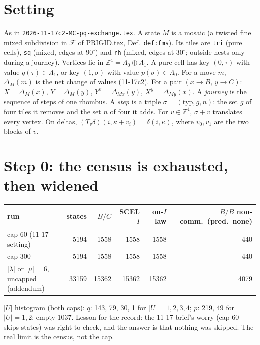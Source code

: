 \documentclass[11pt]{article}
\theoremstyle{definition}\newtheorem{definition}[theorem]{Definition}\newtheorem{remark}[theorem]{Remark}
\begin{document}
\section{Setting}
As in \texttt{2026-11-17c2-MC-pq-exchange.tex}. A state $M$ is a mosaic (a twisted fine mixed subdivision in $\mathcal F$ of PRIGID.tex, Def.~\texttt{def:fms}). Its tiles are
\texttt{tri} (pure cells), \texttt{sq} (mixed, edges at $90^\circ$) and \texttt{rh} (mixed, edges at $30^\circ$; outside nests only during a journey). Vertices lie in
$\mathbb Z^4=\Lambda_0\oplus\Lambda_1$. A pure cell has key $(0,\tau)$ with value $q(\tau)\in\Lambda_1$, or key $(1,\sigma)$ with value $p(\sigma)\in\Lambda_0$. For a move $m$,
$\Delta_M(m)$ is the net change of values (11-17c2). For a pair $(x\to B,\,y\to C)$: $X=\Delta_M(x)$, $Y=\Delta_M(y)$, $Y^x=\Delta_{Mx}(y)$, $X^y=\Delta_{My}(x)$.
A \emph{journey} is the sequence of steps of one rhombus. A \emph{step} is a triple $\sigma=(\mathrm{typ},g,n)$: the set $g$ of four tiles it removes and the set $n$ of four it adds.
For $v\in\mathbb Z^4$, $\sigma+v$ translates every vertex. On deltas, $(T_v\delta)(i,\kappa+v_i)=\delta(i,\kappa)$, where $v_0,v_1$ are the two blocks of $v$.

\section{Step 0: the census is exhausted, then widened}\label{sec:step0}
\begin{center}\begin{tabular}{lrrrrr}\toprule
run & states & $B/C$ & SCEL $I$ & on-$I$ law & $B/B$ non-comm.\ (pred.\ none)\\\midrule
cap 60 (11-17 setting) & 5194 & 1558 & 1558 & 1558 & 440\\
cap 300 & 5194 & 1558 & 1558 & 1558 & 440\\
$|\lambda|$ or $|\mu|=6$, uncapped (addendum) & 33159 & 15362 & 15362 & 15362 & 4079\\\bottomrule
\end{tabular}\end{center}
$|U|$ histogram (both caps): $q$: 143, 79, 30, 1 for $|U|=1,2,3,4$; $p$: 219, 49 for $|U|=1,2$; empty 1037.
Lesson for the record: the 11-17 brief's worry (cap 60 skips states) was right to check, and the answer is that nothing was skipped. The real limit is the census, not the cap.
\end{document}
